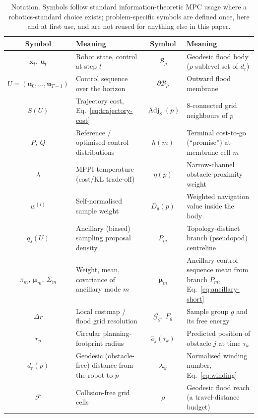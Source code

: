 \documentclass[journal]{IEEEtran}
\begin{document}
\begin{table}[t]
\centering
\caption{Notation. Symbols follow standard information-theoretic MPC usage
\cite{williams2017mppi,williams2018mppi,trevisan2024biased} where a
robotics-standard choice exists; problem-specific symbols are defined once,
here and at first use, and are not reused for anything else in this paper.}
\label{tab:notation}
\begin{tabular}{cl@{\hspace{2.2em}}cl}
\toprule
Symbol & Meaning & Symbol & Meaning \\
\midrule
$\mathbf x_t,\ \mathbf u_t$ & Robot state, control at step $t$ &
  $\mathcal B_\rho$ & Geodesic flood body ($\rho$-sublevel set of $d_r$) \\
$U=(\mathbf u_0,\ldots,\mathbf u_{T-1})$ & Control sequence over the horizon &
  $\partial\mathcal B_\rho$ & Outward flood membrane \\
$S(U)$ & Trajectory cost, Eq.~\eqref{eq:trajectory-cost} &
  $\operatorname{Adj}_8(p)$ & 8-connected grid neighbours of $p$ \\
$P,\ Q$ & Reference / optimised control distributions &
  $h(m)$ & Terminal cost-to-go (``promise'') at membrane cell $m$ \\
$\lambda$ & MPPI temperature (cost/KL trade-off) &
  $\eta(p)$ & Narrow-channel obstacle-proximity weight \\
$w^{(i)}$ & Self-normalised sample weight &
  $D_g(p)$ & Weighted navigation value inside the body \\
$q_s(U)$ & Ancillary (biased) sampling proposal density &
  $P_m$ & Topology-distinct branch (pseudopod) centreline \\
$\pi_m,\ \boldsymbol\mu_m,\ \Sigma_m$ & Weight, mean, covariance of ancillary mode $m$ &
  $\boldsymbol\mu_m$ & Ancillary control-sequence mean from branch $P_m$, Eq.~\eqref{eq:ancillary-short} \\
$\Delta r$ & Local costmap / flood grid resolution &
  $\mathcal G_g,\ F_g$ & Sample group $g$ and its free energy \\
$r_p$ & Circular planning-footprint radius &
  $\hat o_j(\tau_k)$ & Predicted position of obstacle $j$ at time $\tau_k$ \\
$d_r(p)$ & Geodesic (obstacle-free) distance from the robot to $p$ &
  $\lambda_{\mathrm w}$ & Normalised winding number, Eq.~\eqref{eq:winding} \\
$\mathcal F$ & Collision-free grid cells &
  $\rho$ & Geodesic flood reach (a travel-distance budget) \\
\bottomrule
\end{tabular}
\end{table}
\end{document}
